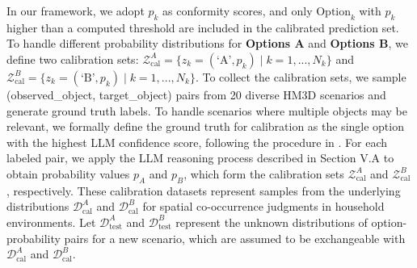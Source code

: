 In our framework, we adopt $p_k$ as conformity scores, and only $\text{Option}_k$ with $p_k$ higher than a computed threshold are included in the calibrated prediction set. To handle different probability distributions for \textbf{Options A} and \textbf{Options B}, we define two calibration sets: \( \mathcal{Z}^{A}_{\text{cal}} = \{ z_k = (\text{`A'}, p_k) \mid k=1,..., N_k\} \) and \( \mathcal{Z}^{B}_{\text{cal}} = \{ z_k = (\text{`B'}, p_k) \mid k=1,..., N_k\} \). 
To collect the calibration sets, we sample (observed\_object, target\_object) pairs from 20 diverse HM3D scenarios and generate ground truth labels. To handle scenarios where multiple objects may be relevant, we formally define the ground truth for calibration as the single option with the highest LLM confidence score, following the procedure in \cite{ren2023robots}. For each labeled pair, we apply the LLM reasoning process described in Section V.A to obtain probability values $p_A$ and $p_B$, which form the calibration sets $\mathcal{Z}^{A}_{\text{cal}}$ and $\mathcal{Z}^{B}_{\text{cal}}$, respectively. 
These calibration datasets represent samples from the underlying distributions $\mathcal{D}^{A}_{\text{cal}}$ and $\mathcal{D}^{B}_{\text{cal}}$ for spatial co-occurrence judgments in household environments. 
Let $\mathcal{D}^{A}_{\text{test}}$ and $\mathcal{D}^{B}_{\text{test}}$ represent the unknown distributions of option-probability pairs for a new scenario, which are assumed to be exchangeable with $\mathcal{D}^{A}_{\text{cal}}$ and $\mathcal{D}^{B}_{\text{cal}}$.


